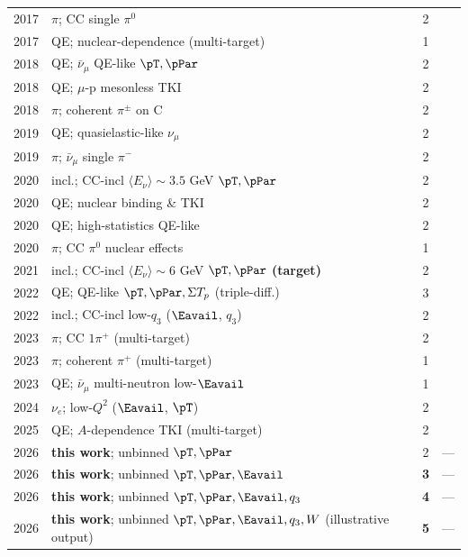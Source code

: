 {\begin{longtable}{@{}clcl@{}}
  2017 & $\pi$; CC single $\pi^0$                  & 2 & \cite{MINERvA:2017pi0} \\
  2017 & QE; nuclear-dependence (multi-target)     & 1 & \cite{MINERvA:2017Adep} \\
  2018 & QE; $\bar\nu_\mu$ QE-like $\pT,\pPar$     & 2 & \cite{MINERvA:2018hba} \\
  2018 & QE; $\mu$-p mesonless TKI                 & 2 & \cite{MINERvA:2018tcb} \\
  2018 & $\pi$; coherent $\pi^\pm$ on C            & 2 & \cite{MINERvA:2018coh} \\
  2019 & QE; quasielastic-like $\nu_\mu$           & 2 & \cite{MINERvA:2019qe} \\
  2019 & $\pi$; $\bar\nu_\mu$ single $\pi^-$       & 2 & \cite{MINERvA:2019pim} \\
  2020 & incl.; CC-incl $\langle E_\nu\rangle\!\sim\!3.5$ GeV $\pT,\pPar$ & 2 & \cite{MINERvA:2020jwd} \\
  2020 & QE; nuclear binding \& TKI               & 2 & \cite{MINERvA:2020cgh} \\
  2020 & QE; high-statistics QE-like              & 2 & \cite{MINERvA:2020qehs} \\
  2020 & $\pi$; CC $\pi^0$ nuclear effects        & 1 & \cite{MINERvA:2020pi0} \\
  2021 & incl.; CC-incl $\langle E_\nu\rangle\!\sim\!6$ GeV $\pT,\pPar$ \textbf{(target)} & 2 & \cite{MINERvA:2021owq} \\
  2022 & QE; QE-like $\pT,\pPar,\Sigma T_p$ (triple-diff.) & 3 & \cite{MINERvA:2022qelike3d} \\
  2022 & incl.; CC-incl low-$q_{3}$ ($\Eavail$, $q_{3}$) & 2 & \cite{MINERvA:2022incl} \\
  2023 & $\pi$; CC $1\pi^+$ (multi-target)        & 2 & \cite{MINERvA:2023ccpi} \\
  2023 & $\pi$; coherent $\pi^+$ (multi-target)   & 1 & \cite{MINERvA:2023coh} \\
  2023 & QE; $\bar\nu_\mu$ multi-neutron low-$\Eavail$ & 1 & \cite{MINERvA:2023lowEavail} \\
  2024 & $\nu_e$; low-$Q^2$ ($\Eavail$, $\pT$)    & 2 & \cite{MINERvA:2023avz} \\
  2025 & QE; $A$-dependence TKI (multi-target)    & 2 & \cite{MINERvA:2025tki} \\
  \midrule
  2026 & \textbf{this work}; unbinned $\pT,\pPar$            & 2 & --- \\
  2026 & \textbf{this work}; unbinned $\pT,\pPar,\Eavail$    & \textbf{3} & --- \\
  2026 & \textbf{this work}; unbinned $\pT,\pPar,\Eavail,q_{3}$ & \textbf{4} & --- \\
  2026 & \textbf{this work}; unbinned $\pT,\pPar,\Eavail,q_{3},W$ (illustrative output) & \textbf{5} & --- \\
\end{longtable}
}

